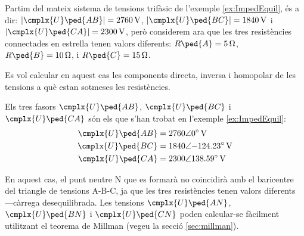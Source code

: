 \begin{exemple}\label{ex:ImpedDesequil}
	\addcontentsxms{\ImpedDesequil}
    Partim del mateix sistema de tensions trifàsic de l'exemple \vref{ex:ImpedEquil}, és a dir: $|\cmplx{U}\ped{AB}| =  \qty{2760}{V}$, $|\cmplx{U}\ped{BC}| = \qty{1840}{V}$ i
    $|\cmplx{U}\ped{CA}| = \qty{2300}{V}$, però considerem ara que les tres resistències connectades en estrella tenen valors diferents:  $R\ped{A}=\qty{5}{\ohm}$, $R\ped{B}=\qty{10}{\ohm}$,  i $R\ped{C}=\qty{15}{\ohm}$.

    \begin{center}
        
    \end{center}

    Es vol calcular en aquest cas  les components directa, inversa i homopolar de les tensions a què estan sotmeses les resistències.

    Els tres fasors $\cmplx{U}\ped{AB} $, $\cmplx{U}\ped{BC} $ i $\cmplx{U}\ped{CA}$ són els que s'han trobat en l'exemple \ref{ex:ImpedEquil}:
    \begin{align*}
        \cmplx{U}\ped{AB} &= \complexqty{2760:0}{V} \\
        \cmplx{U}\ped{BC} &= \complexqty{1840:-124,23}{V} \\
        \cmplx{U}\ped{CA} &= \complexqty{2300:138,59}{V}
    \end{align*}

    En aquest cas, el punt neutre N que es formarà no coincidirà amb el baricentre del triangle de tensions A-B-C, ja que les tres resistències tenen valors diferents ---càrrega  desequilibrada. Les tensions $\cmplx{U}\ped{AN} $, $\cmplx{U}\ped{BN} $ i $\cmplx{U}\ped{CN}$ poden calcular-se fàcilment utilitzant el teorema de Millman (vegeu la secció \vref{sec:millman}).


\end{exemple}
